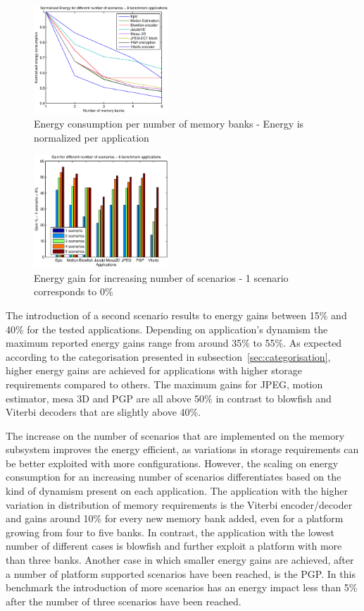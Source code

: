 \documentclass[a4paper,conference]{IEEEtran}
\begin{document}
\begin{figure}[!t]
\centering
\includegraphics[width=0.45\textwidth]{Images/6apps.eps}
\caption{Energy consumption per number of memory banks - Energy is normalized per application}
\label{fig:energy}
\end{figure}

\begin{figure}[!t]
\centering
\includegraphics[width=0.45\textwidth]{Images/6appsGains.eps}
\caption{Energy gain for increasing number of scenarios - 1 scenario corresponds to 0\%}
\label{fig:gains}
\end{figure}

The introduction of a second scenario results to energy gains between 15\% and  40\%  for the tested applications. Depending on application's dynamism the maximum reported energy gains range from around 35\% to 55\%. As expected according to the categorisation presented in subsection~\ref{sec:categorisation}, higher energy gains are achieved for applications with higher storage requirements compared to others. The maximum gains for JPEG, motion estimator, mesa 3D and PGP are all above 50\% in contrast to blowfish and Viterbi decoders that are slightly above 40\%.

The increase on the number of scenarios that are implemented on the memory subsystem improves the energy efficient, as variations in storage requirements can be better exploited with more configurations. However, the scaling on energy consumption for an increasing number of scenarios differentiates based on the kind of dynamism present on each application. The application with the higher variation in distribution of memory requirements is the Viterbi encoder/decoder and gains around 10\% for every new memory bank added, even for a platform growing from four to five banks. In contrast, the application with the lowest number of different cases is blowfish and further exploit a platform with more than three banks. Another case in which smaller energy gains are achieved, after a number of platform supported scenarios have been reached, is the PGP. In this benchmark the introduction of more scenarios has an energy impact less than 5\% after the number of three scenarios have been reached.
\end{document}
